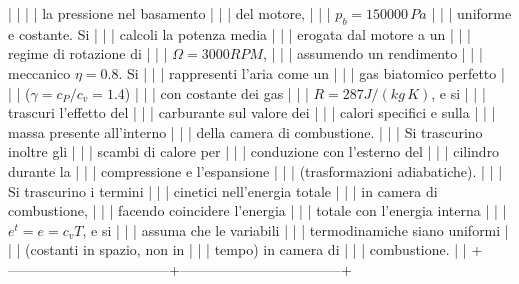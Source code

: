 \documentclass[letterpaper,10pt,italian]{jupyterBook}
\begin{document}
|                                   |                                   |
| \sphinxhyphen{}   la pressione nel basamento    |                                   |
|     del motore,                   |                                   |
|     \(p_{b} = 150000 \, Pa\)        |                                   |
|     uniforme e costante. Si       |                                   |
|     calcoli la potenza media      |                                   |
|     erogata dal motore a un       |                                   |
|     regime di rotazione di        |                                   |
|     \(\Omega = 3000 RPM\),          |                                   |
|     assumendo un rendimento       |                                   |
|     meccanico \(\eta = 0.8\). Si    |                                   |
|     rappresenti l’aria come un    |                                   |
|     gas bi\sphinxhyphen{}atomico perfetto       |                                   |
|     (\(\gamma = c_P/ c_v = 1.4\))   |                                   |
|     con costante dei gas          |                                   |
|     \(R = 287 J / (kg \, K)\), e si |                                   |
|     trascuri l’effetto del        |                                   |
|     carburante sul valore dei     |                                   |
|     calori specifici e sulla      |                                   |
|     massa presente all’interno    |                                   |
|     della camera di combustione.  |                                   |
|     Si trascurino inoltre gli     |                                   |
|     scambi di calore per          |                                   |
|     conduzione con l’esterno del  |                                   |
|     cilindro durante la           |                                   |
|     compressione e l’espansione   |                                   |
|     (trasformazioni adiabatiche). |                                   |
|     Si trascurino i termini       |                                   |
|     cinetici nell’energia totale  |                                   |
|     in camera di combustione,     |                                   |
|     facendo coincidere l’energia  |                                   |
|     totale con l’energia interna  |                                   |
|     \(e^t = e = c_v T\), e si       |                                   |
|     assuma che le variabili       |                                   |
|     termodinamiche siano uniformi |                                   |
|     (costanti in spazio, non in   |                                   |
|     tempo) in camera di           |                                   |
|     combustione.                  |                                   |
+———————————–+———————————–+
\end{document}
